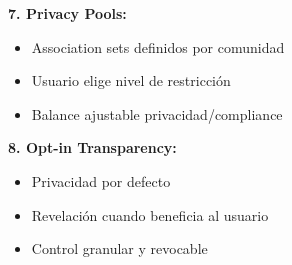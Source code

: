 \documentclass[11pt,a4paper,twoside]{book}
\theoremstyle{definition}
\theoremstyle{remark}
\begin{document}
\begin{keyidea}
\textbf{7. Privacy Pools:}
\begin{itemize}
    \item Association sets definidos por comunidad
    \item Usuario elige nivel de restricción
    \item Balance ajustable privacidad/compliance
\end{itemize}

\textbf{8. Opt-in Transparency:}
\begin{itemize}
    \item Privacidad por defecto
    \item Revelación cuando beneficia al usuario
    \item Control granular y revocable
\end{itemize}
\end{keyidea}
\end{document}
